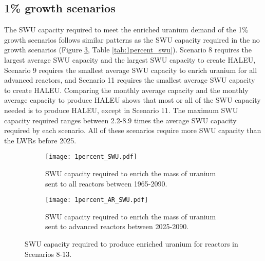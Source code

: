 \subsection{1\% growth scenarios}
The \gls{SWU} capacity required to meet the enriched uranium demand of 
the 1\% growth scenarios 
follows similar patterns as the \gls{SWU} capacity required in the no 
growth scenarios (Figure \ref{fig:1percent_swu}, Table \ref{tab:1percent_swu}).
Scenario 8 requires the largest average \gls{SWU} 
capacity and the largest \gls{SWU} capacity to create \gls{HALEU}, Scenario 
9 requires the smallest average \gls{SWU} capacity to enrich uranium 
for all advanced reactors, and 
Scenario 11 requires the smallest average \gls{SWU} capacity 
to create \gls{HALEU}. Comparing 
the monthly average capacity and the monthly average capacity to produce \gls{HALEU} 
shows that most or all of the \gls{SWU} capacity needed is to produce 
\gls{HALEU}, except in Scenario 11. The 
maximum \gls{SWU} capacity required ranges between 2.2-8.9 times 
the average \gls{SWU} capacity required by each scenario. All of these 
scenarios require more \gls{SWU} capacity than the \glspl{LWR} before 
2025. 

\begin{figure}[h!]
    \centering
    \begin{subfigure}[b]{0.45\textwidth}
        \centering
        \texttt{[image: 1percent\_SWU.pdf]}
        \caption{\gls{SWU} capacity required to enrich the mass of 
        uranium sent to all reactors between 1965-2090.}
        \label{fig:1percent_all_SWU}
    \end{subfigure}
    \hfill
    \begin{subfigure}[b]{0.45\textwidth}
        \centering
        \texttt{[image: 1percent\_AR\_SWU.pdf]}
        \caption{\gls{SWU} capacity required to enrich the mass of 
        uranium sent to advanced reactors between 2025-2090.}
        \label{fig:1percent_AR_SWU}
    \end{subfigure}
       \caption{\gls{SWU} capacity required to produce enriched uranium 
       for reactors in Scenarios 8-13.}
       \label{fig:1percent_swu}
\end{figure}


